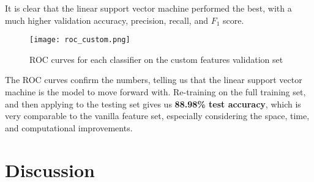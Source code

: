 \documentclass{article} %
\begin{document}
It is clear that the linear support vector machine performed the best, with a much higher validation accuracy, precision, recall, and $F_1$ score.
\begin{figure}[ht]
\centering
\texttt{[image: roc\_custom.png]}
\caption{ROC curves for each classifier on the custom features validation set}
\end{figure}
The ROC curves confirm the numbers, telling us that the linear support vector machine is the model to move forward with.  Re-training on the full training set, and then applying to the testing set gives us \textbf{88.98\% test accuracy}, which is very comparable to the vanilla feature set, especially considering the space, time, and computational improvements.
\section{Discussion}
\end{document}
